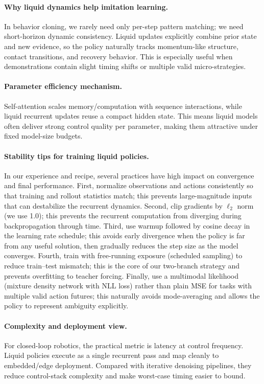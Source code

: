 \documentclass{article}
\begin{document}
\paragraph{Why liquid dynamics help imitation learning.}
In behavior cloning, we rarely need only per-step pattern matching; we need short-horizon dynamic consistency. Liquid updates explicitly combine prior state and new evidence, so the policy naturally tracks momentum-like structure, contact transitions, and recovery behavior. This is especially useful when demonstrations contain slight timing shifts or multiple valid micro-strategies.

\paragraph{Parameter efficiency mechanism.}
Self-attention scales memory/computation with sequence interactions, while liquid recurrent updates reuse a compact hidden state. This means liquid models often deliver strong control quality per parameter, making them attractive under fixed model-size budgets.

\paragraph{Stability tips for training liquid policies.}
In our experience and recipe, several practices have high impact on convergence and final performance. First, normalize observations and actions consistently so that training and rollout statistics match; this prevents large-magnitude inputs that can destabilize the recurrent dynamics. Second, clip gradients by $\ell_2$ norm (we use 1.0); this prevents the recurrent computation from diverging during backpropagation through time. Third, use warmup followed by cosine decay in the learning rate schedule; this avoids early divergence when the policy is far from any useful solution, then gradually reduces the step size as the model converges. Fourth, train with free-running exposure (scheduled sampling) to reduce train--test mismatch; this is the core of our two-branch strategy and prevents overfitting to teacher forcing. Finally, use a multimodal likelihood (mixture density network with NLL loss) rather than plain MSE for tasks with multiple valid action futures; this naturally avoids mode-averaging and allows the policy to represent ambiguity explicitly.

\paragraph{Complexity and deployment view.}
For closed-loop robotics, the practical metric is latency at control frequency. Liquid policies execute as a single recurrent pass and map cleanly to embedded/edge deployment. Compared with iterative denoising pipelines, they reduce control-stack complexity and make worst-case timing easier to bound.
\end{document}
